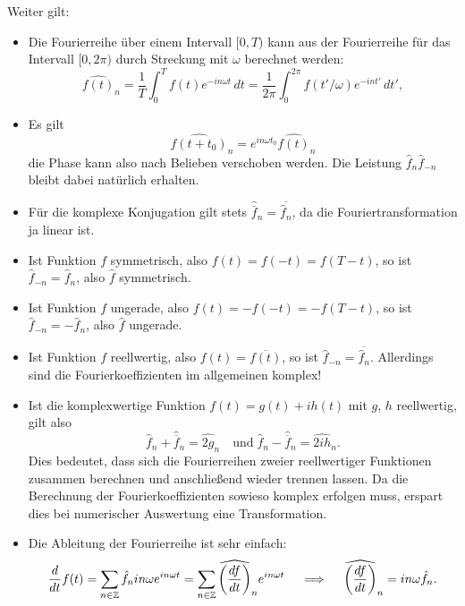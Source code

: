 Weiter gilt:
\begin{itemize}
\item Die Fourierreihe über einem Intervall $[0,T)$ kann aus der
  Fourierreihe für das Intervall $[0,2\pi)$ durch Streckung mit
  $\omega$ berechnet werden:
  \begin{equation}
    \widehat{f(t)}_n = \frac{1}{T}\int_0^T f(t)e^{-i n\omega t}\, dt
    = \frac{1}{2\pi}\int_0^{2\pi} f(t'/\omega)e^{-i n t'}\, dt',
  \end{equation}
\item Es gilt
  \begin{equation}
    \widehat{f(t + t_0)}_{n} = e^{i n \omega t_0} \widehat{f(t)}_{n}
  \end{equation}
  die Phase kann also nach Belieben verschoben werden. Die Leistung
  $\hat{f}_{n}\hat{f}_{-n}$ bleibt dabei natürlich erhalten.
\item Für die komplexe Konjugation gilt stets
  $\widehat{\overline{f}}_n = \overline{\hat{f}_n}$, da die
  Fouriertransformation ja linear ist.
\item Ist Funktion $f$ symmetrisch, also $f(t) = f(-t) = f(T-t)$, so ist
  $\hat{f}_{-n} = \hat{f}_n$, also $\hat{f}$ symmetrisch.
\item Ist Funktion $f$ ungerade, also $f(t) = -f(-t) = -f(T-t)$, so ist
  $\hat{f}_{-n} = -\hat{f}_n$, also $\hat{f}$ ungerade.
\item Ist Funktion $f$ reellwertig, also $f(t) = \overline{f(t)}$, so
  ist $\hat{f}_{-n} = \overline{\hat{f}_n}$. Allerdings sind die
  Fourierkoeffizienten im allgemeinen komplex!
\item 
  Ist die komplexwertige Funktion $f(t)=g(t) + ih(t)$ mit $g$, $h$
  reellwertig, gilt also
  \begin{equation}
    \hat{f}_{n}  + \hat{\overline{f}}_{n} = \widehat{2g}_{n}
    \quad\text{und}\;
    \hat{f}_{n}  - \hat{\overline{f}}_{n} = \widehat{2ih}_{n}.
  \end{equation}
  Dies bedeutet, dass sich die Fourierreihen zweier reellwertiger
  Funktionen zusammen berechnen und anschließend wieder trennen
  lassen. Da die Berechnung der Fourierkoeffizienten sowieso komplex
  erfolgen muss, erspart dies bei numerischer Auswertung eine
  Transformation.
\item Die Ableitung der Fourierreihe ist sehr einfach:
  \begin{equation}
    \frac{d}{dt}  f(t) = \sum_{n\in\mathbb{Z}} \hat{f}_n i n\omega e^{i n\omega
      t} = \sum_{n\in\mathbb{Z}} \widehat{\left(\frac{df}{dt}\right)}_n e^{i n\omega
      t}\quad\implies\quad \widehat{\left(\frac{df}{dt}\right)}_n= i n\omega\hat{f}_n.
  \end{equation}
\end{itemize}

